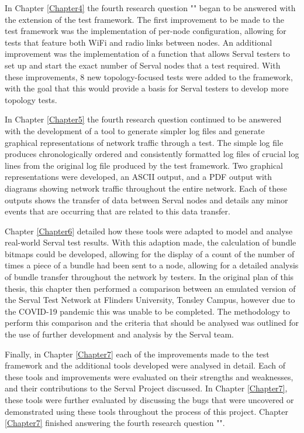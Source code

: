 In Chapter \ref{Chapter4} the fourth research question "\fourthRQ" began to be answered with the extension of the test framework.
The first improvement to be made to the test framework was the implementation of per-node configuration, allowing for tests that feature both WiFi and radio links between nodes.
An additional improvement was the implementation of a function that allows Serval testers to set up and start the exact number of Serval nodes that a test required.
With these improvements, 8 new topology-focused tests were added to the framework, with the goal that this would provide a basis for Serval testers to develop more topology tests.

In Chapter \ref{Chapter5} the fourth research question continued to be answered with the development of a tool to generate simpler log files and generate graphical representations of network traffic through a test.
The simple log file produces chronologically ordered and consistently formatted log files of crucial log lines from the original log file produced by the test framework.
Two graphical representations were developed, an ASCII output, and a PDF output with diagrams showing network traffic throughout the entire network.
Each of these outputs shows the transfer of data between Serval nodes and details any minor events that are occurring that are related to this data transfer.

Chapter \ref{Chapter6} detailed how these tools were adapted to model and analyse real-world Serval test results.
With this adaption made, the calculation of bundle bitmaps could be developed, allowing for the display of a count of the number of times a piece of a bundle had been sent to a node, allowing for a detailed analysis of bundle transfer throughout the network by testers.
In the original plan of this thesis, this chapter then performed a comparison between an emulated version of the Serval Test Network at Flinders University, Tonsley Campus, however due to the COVID-19 pandemic this was unable to be completed.
The methodology to perform this comparison and the criteria that should be analysed was outlined for the use of further development and analysis by the Serval team.

Finally, in Chapter \ref{Chapter7} each of the improvements made to the test framework and the additional tools developed were analysed in detail.
Each of these tools and improvements were evaluated on their strengths and weaknesses, and their contributions to the Serval Project discussed.
In Chapter \ref{Chapter7}, these tools were further evaluated by discussing the bugs that were uncovered or demonstrated using these tools throughout the process of this project.
Chapter \ref{Chapter7} finished answering the fourth research question "\fourthRQ".



